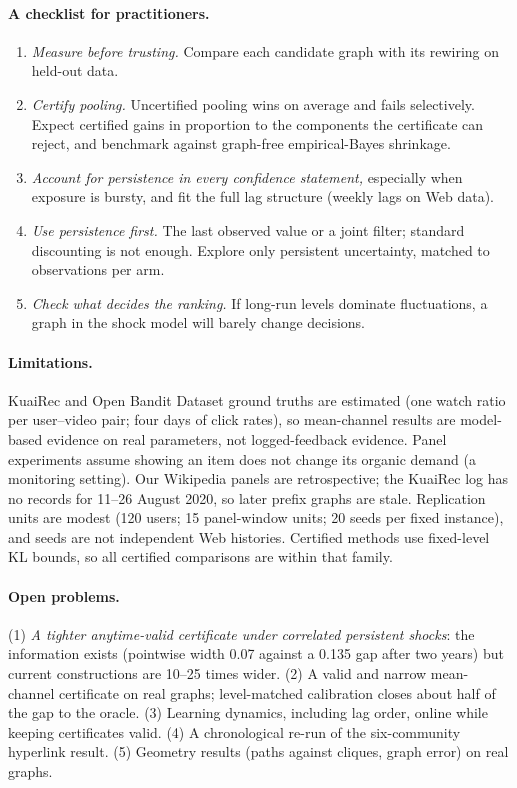\documentclass[11pt]{article}
\theoremstyle{definition}
\theoremstyle{remark}
\begin{document}
\paragraph{A checklist for practitioners.}
\begin{enumerate}
\item \emph{Measure before trusting.} Compare each candidate graph with its rewiring on held-out data.
\item \emph{Certify pooling.} Uncertified pooling wins on average and fails selectively. Expect certified gains in proportion to the components the certificate can reject, and benchmark against graph-free empirical-Bayes shrinkage.
\item \emph{Account for persistence in every confidence statement,} especially when exposure is bursty, and fit the full lag structure (weekly lags on Web data).
\item \emph{Use persistence first.} The last observed value or a joint filter; standard discounting is not enough. Explore only persistent uncertainty, matched to observations per arm.
\item \emph{Check what decides the ranking.} If long-run levels dominate fluctuations, a graph in the shock model will barely change decisions.
\end{enumerate}

\paragraph{Limitations.} KuaiRec and Open Bandit Dataset ground truths are estimated (one watch ratio per user--video pair; four days of click rates), so mean-channel results are model-based evidence on real parameters, not logged-feedback evidence. Panel experiments assume showing an item does not change its organic demand (a monitoring setting). Our Wikipedia panels are retrospective; the KuaiRec log has no records for 11--26 August 2020, so later prefix graphs are stale. Replication units are modest (120 users; 15 panel-window units; 20 seeds per fixed instance), and seeds are not independent Web histories. Certified methods use fixed-level KL bounds, so all certified comparisons are within that family.

\paragraph{Open problems.} (1) \emph{A tighter anytime-valid certificate under correlated persistent shocks}: the information exists (pointwise width 0.07 against a 0.135 gap after two years) but current constructions are 10--25 times wider. (2) A valid and narrow mean-channel certificate on real graphs; level-matched calibration closes about half of the gap to the oracle. (3) Learning dynamics, including lag order, online while keeping certificates valid. (4) A chronological re-run of the six-community hyperlink result. (5) Geometry results (paths against cliques, graph error) on real graphs.
\end{document}
